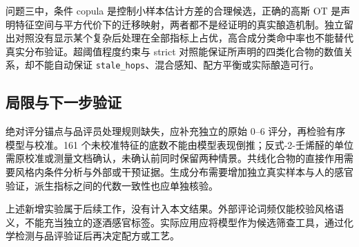 \documentclass[UTF8,a4paper,zihao=-4]{ctexart}
\numberwithin{figure}{section}
\numberwithin{table}{section}
\numberwithin{equation}{section}
\newcommand{\file}[1]{\texttt{#1}}
\begin{document}
问题三中，条件 copula 是控制小样本估计方差的合理候选，正确的高斯 OT 是声明特征空间与平方代价下的迁移映射，两者都不是经证明的真实酿造机制。独立留出对照没有显示某个复杂后处理在全部指标上占优，高合成分类命中率也不能替代真实分布验证。超阈值程度约束与 strict 对照能保证所声明的四类化合物的数值关系，却不能自动保证 \file{stale\_hops}、混合感知、配方平衡或实际酿造可行。

\subsection{局限与下一步验证}

绝对评分锚点与品评员处理规则缺失，应补充独立的原始 0--6 评分，再检验有序模型与校准。161 个未校准特征的底数不能由模型表现倒推；反式-2-壬烯醛的单位需原校准或测量文档确认，未确认前同时保留两种情景。共线化合物的直接作用需要风格内条件分析与外部或干预证据。生成分布需要增加独立真实样本与人的感官验证，派生指标之间的代数一致性也应单独核验。

上述新增实验属于后续工作，没有计入本文结果。外部评论词频仅能校验风格语义，不能充当独立的逐酒感官标签。实际应用应将模型作为候选筛查工具，通过化学检测与品评验证后再决定配方或工艺。
\end{document}
